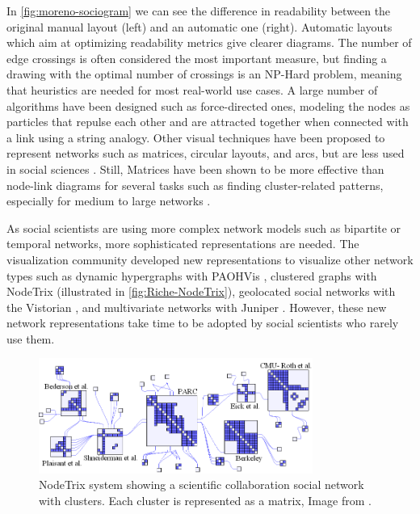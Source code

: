 In \autoref{fig:moreno-sociogram} we can see the difference in readability between the original manual layout (left) and an automatic one (right).
Automatic layouts which aim at optimizing readability metrics give clearer diagrams.
The number of edge crossings is often considered the most important measure, but finding a drawing with the optimal number of crossings is an NP-Hard problem, meaning that heuristics are needed for most real-world use cases.
A large number of algorithms have been designed such as force-directed ones\cite{battistaGraphDrawingAlgorithms1998}, modeling the nodes as particles that repulse each other and are attracted together when connected with a link using a string analogy.
Other visual techniques have been proposed to represent networks such as matrices, circular layouts, and arcs, but are less used in social sciences \cite{mcguffinSimpleAlgorithmsNetwork2012}.
Still, Matrices have been shown to be more effective than node-link diagrams for several tasks such as finding cluster-related patterns, especially for medium to large networks \cite{ghoniemComparisonReadabilityGraphs2004, abdelaalComparativeEvaluationBipartite2022}.


As social scientists are using more complex network models such as bipartite or temporal networks, more sophisticated representations are needed.
The visualization community developed new representations to visualize other network types such as dynamic hypergraphs with PAOHVis \cite{valdiviaAnalyzingDynamicHypergraphs2021}, clustered graphs with NodeTrix \cite{henryNodeTrixHybridVisualization2007} (illustrated in \autoref{fig:Riche-NodeTrix}), geolocated social networks with the Vistorian \cite{serranomolineroUnderstandingUseVistorian2017}, and multivariate networks with Juniper \cite{nobreJuniperTreeTable2019}.
However, these new network representations take time to be adopted by social scientists who rarely use them.
\begin{figure}
    \centering %
    \includegraphics[width=0.8\textwidth]{static/figures/RelatedWork/NodeTrix.png}
    \caption{NodeTrix system showing a scientific collaboration social network with clusters. Each cluster is represented as a matrix,  Image from \cite{henryNodeTrixHybridVisualization2007}.}
    \label{fig:Riche-NodeTrix}
\end{figure}


